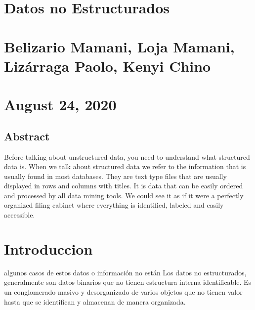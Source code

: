 \documentclass{article} %
\begin{document}


\noindent 

\noindent 

\noindent 

\noindent 

\noindent {}\textit{\underbar{ }}\textit{\underbar{  }}

\noindent 

\noindent 
\section{Datos no Estructurados}

\noindent 
\section{Belizario Mamani, Loja Mamani, Liz\'{a}rraga Paolo, Kenyi Chino}

\noindent 
\section{August 24, 2020}

\noindent 
\subsection{Abstract}

\noindent \textbf{}

\noindent Before talking about unstructured data, you need to understand what structured data is. When we talk about structured data we refer to the information that is usually found in most databases. They are text type files that are usually displayed in rows and columns with titles. It is data that can be easily ordered and processed by all data mining tools. We could see it as if it were a perfectly organized filing cabinet where everything is identified, labeled and easily accessible.

\noindent \underbar{}

\noindent 


\section{ Introduccion}

\noindent algunos casos de estos datos o informaci\'{o}n no est\'{a}n Los datos no estructurados, generalmente son datos binarios que no tienen estructura interna identificable. Es un conglomerado masivo y desorganizado de varios objetos que no tienen valor hasta que se identifican y almacenan de manera organizada.
\end{document}
